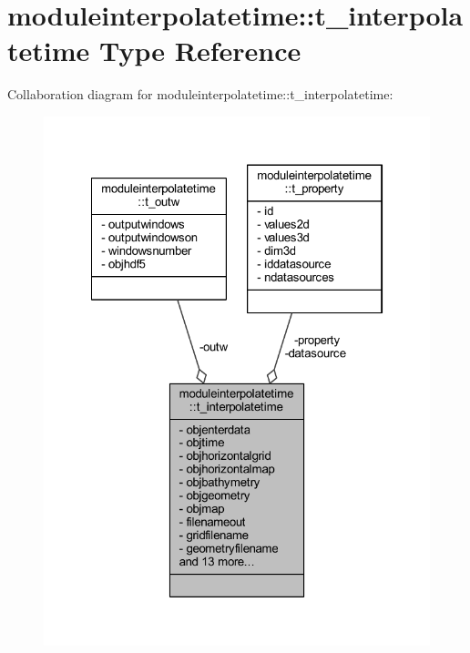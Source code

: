 \hypertarget{structmoduleinterpolatetime_1_1t__interpolatetime}{}\section{moduleinterpolatetime\+:\+:t\+\_\+interpolatetime Type Reference}
\label{structmoduleinterpolatetime_1_1t__interpolatetime}


Collaboration diagram for moduleinterpolatetime\+:\+:t\+\_\+interpolatetime\+:\nopagebreak
\begin{figure}[H]
\begin{center}
\leavevmode
\includegraphics[width=322pt]{structmoduleinterpolatetime_1_1t__interpolatetime__coll__graph}
\end{center}
\end{figure}
